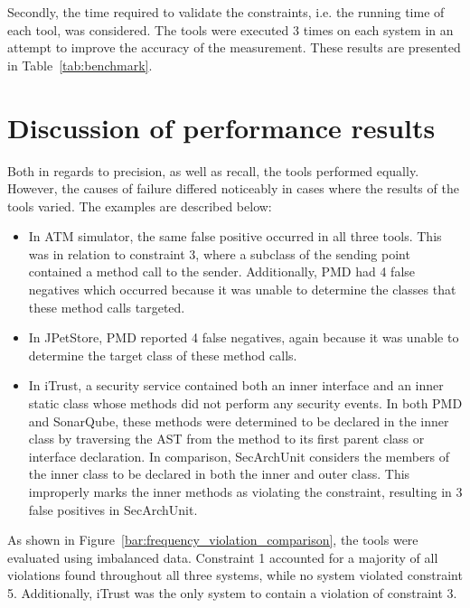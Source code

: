 Secondly, the time required to validate the constraints, i.e. the running time of each tool, was considered. The tools were executed 3 times on each system in an attempt to improve the accuracy of the measurement. These results are presented in Table~\ref{tab:benchmark}.





\clearpage
\section{Discussion of performance results}

Both in regards to precision, as well as recall, the tools performed equally. However, the causes of failure differed noticeably in cases where the results of the tools varied. The examples are described below:

\begin{itemize}
    \item In ATM simulator, the same false positive occurred in all three tools. This was in relation to constraint 3, where a subclass of the sending point contained a method call to the sender. Additionally, PMD had 4 false negatives which occurred because it was unable to determine the classes that these method calls targeted.
    \item In JPetStore, PMD reported 4 false negatives, again because it was unable to determine the target class of these method calls.
    \item In iTrust, a security service contained both an inner interface and an inner static class whose methods did not perform any security events. In both PMD and SonarQube, these methods were determined to be declared in the inner class by traversing the AST from the method to its first parent class or interface declaration. In comparison, SecArchUnit considers the members of the inner class to be declared in both the inner and outer class. This improperly marks the inner methods as violating the constraint, resulting in 3 false positives in SecArchUnit.
\end{itemize}

As shown in Figure~\ref{bar:frequency_violation_comparison}, the tools were evaluated using imbalanced data. Constraint 1 accounted for a majority of all violations found throughout all three systems, while no system violated constraint 5. Additionally, iTrust was the only system to contain a violation of constraint 3. 

